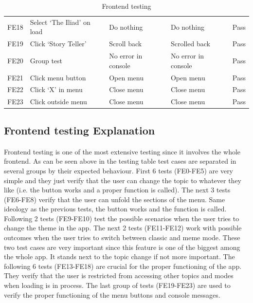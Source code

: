 \documentclass[12pt]{report}
\begin{document}
\begin{appendices}
\begin{table}[ht]
\begin{tabular}{lllll}
  \addlinespace[3pt]
  FE18 & Select `The Iliad' on load & Do nothing & Do nothing & Pass\\
  \addlinespace[3pt]
  FE19 & Click `Story Teller' & Scroll back & Scrolled back & Pass\\
  \addlinespace[3pt]
  FE20 & Group test & No error in console & No error in console & Pass\\
  \addlinespace[3pt]
  FE21 & Click menu button & Open menu & Open menu & Pass\\
  \addlinespace[3pt]
  FE22 & Click `X' in menu & Close menu & Close menu & Pass\\
  \addlinespace[3pt]
  FE23 & Click outside menu & Close menu & Close menu & Pass\\

  \bottomrule
  \end{tabular}
  \caption{Frontend testing}
\end{table}

\clearpage

\subsection*{Frontend testing Explanation}
\label{appendix:frontend_testing_explanation}
\paragraph{}
Frontend testing is one of the most extensive testing since it involves the whole frontend.
As can be seen above in the testing table test cases are separated in several groups by their expected
behaviour. First 6 tests (FE0-FE5) are very simple and they just verify that the user can change the topic
to whatever they like (i.e. the button works and a proper function is called). The next 3 tests (FE6-FE8)
verify that the user can unfold the sections of the menu. Same ideology as the previous tests, the button
works and the function is called. Following 2 tests (FE9-FE10) test the possible scenarios when the user
tries to change the theme in the app. The next 2 tests (FE11-FE12) work with possible outcomes when the user
tries to switch between classic and meme mode. These two test cases are very important since this feature is one
of the biggest among the whole app. It stands next to the topic change if not more important. The following
6 tests (FE13-FE18) are crucial for the proper functioning of the app. They verify that the user is restricted
from accessing other topics and modes when loading is in process. The last group of tests (FE19-FE23) are used
to verify the proper functioning of the menu buttons and console messages.


\end{appendices}
\end{document}
